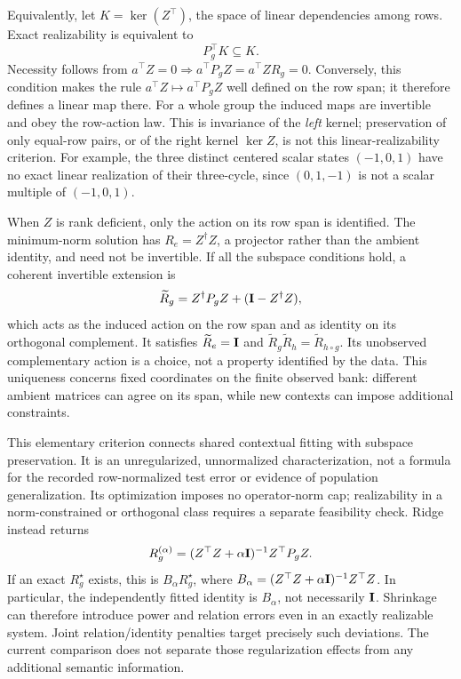 Equivalently, let $K=\ker(Z^\top)$, the space of linear dependencies among rows. Exact realizability is equivalent to
\[
 P_g^\top K\subseteq K.
\]
Necessity follows from $a^\top Z=0\Rightarrow a^\top P_gZ=a^\top ZR_g=0$. Conversely, this condition makes the rule $a^\top Z\mapsto a^\top P_gZ$ well defined on the row span; it therefore defines a linear map there. For a whole group the induced maps are invertible and obey the row-action law. This is invariance of the \emph{left} kernel; preservation of only equal-row pairs, or of the right kernel $\ker Z$, is not this linear-realizability criterion. For example, the three distinct centered scalar states $(-1,0,1)$ have no exact linear realization of their three-cycle, since $(0,1,-1)$ is not a scalar multiple of $(-1,0,1)$.

When $Z$ is rank deficient, only the action on its row span is identified. The minimum-norm solution has $R_e=Z^\dagger Z$, a projector rather than the ambient identity, and need not be invertible. If all the subspace conditions hold, a coherent invertible extension is
\[
 \widetilde R_g=Z^\dagger P_gZ+(\mathbf{I}-Z^\dagger Z),
\]
which acts as the induced action on the row span and as identity on its orthogonal complement. It satisfies $\widetilde R_e=\mathbf{I}$ and $\widetilde R_g\widetilde R_h=\widetilde R_{h\circ g}$. Its unobserved complementary action is a choice, not a property identified by the data. This uniqueness concerns fixed coordinates on the finite observed bank: different ambient matrices can agree on its span, while new contexts can impose additional constraints.

This elementary criterion connects shared contextual fitting with subspace preservation. It is an unregularized, unnormalized characterization, not a formula for the recorded row-normalized test error or evidence of population generalization. Its optimization imposes no operator-norm cap; realizability in a norm-constrained or orthogonal class requires a separate feasibility check. Ridge instead returns
\[
 R_g^{(\alpha)}=(Z^\top Z+\alpha\mathbf{I})^{-1}Z^\top P_gZ.
\]
If an exact $R_g^\star$ exists, this is $B_\alpha R_g^\star$, where $B_\alpha=(Z^\top Z+\alpha\mathbf{I})^{-1}Z^\top Z$. In particular, the independently fitted identity is $B_\alpha$, not necessarily $\mathbf{I}$. Shrinkage can therefore introduce power and relation errors even in an exactly realizable system. Joint relation/identity penalties target precisely such deviations. The current comparison does not separate those regularization effects from any additional semantic information.

